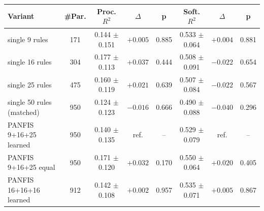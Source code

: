 \begin{tabular}{lccccccc}
\hline
Variant & \#Par. & Proc. $R^2$ & $\Delta$ & p & Soft. $R^2$ & $\Delta$ & p \\
\hline
single 9 rules & 171 & 0.144 $\pm$ 0.151 & $+0.005$ & 0.885 & 0.533 $\pm$ 0.064 & $+0.004$ & 0.881 \\
single 16 rules & 304 & 0.177 $\pm$ 0.113 & $+0.037$ & 0.444 & 0.508 $\pm$ 0.091 & $-0.022$ & 0.654 \\
single 25 rules & 475 & 0.160 $\pm$ 0.119 & $+0.021$ & 0.639 & 0.507 $\pm$ 0.084 & $-0.022$ & 0.567 \\
single 50 rules (matched) & 950 & 0.124 $\pm$ 0.123 & $-0.016$ & 0.666 & 0.490 $\pm$ 0.088 & $-0.040$ & 0.296 \\
PANFIS 9+16+25 learned & 950 & 0.140 $\pm$ 0.135 & ref. & -- & 0.529 $\pm$ 0.079 & ref. & -- \\
PANFIS 9+16+25 equal & 950 & 0.171 $\pm$ 0.120 & $+0.032$ & 0.170 & 0.550 $\pm$ 0.064 & $+0.020$ & 0.405 \\
PANFIS 16+16+16 learned & 912 & 0.142 $\pm$ 0.108 & $+0.002$ & 0.957 & 0.535 $\pm$ 0.071 & $+0.005$ & 0.867 \\
\hline
\end{tabular}
